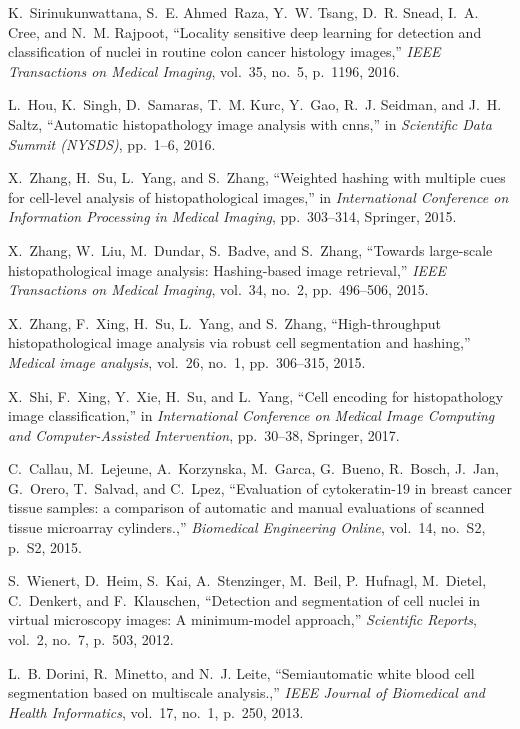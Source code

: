 \documentclass[journal]{IEEEtran}
\begin{document}
\begin{thebibliography}{10}
K.~Sirinukunwattana, S.~E. Ahmed~Raza, Y.~W. Tsang, D.~R. Snead, I.~A. Cree,
  and N.~M. Rajpoot, ``Locality sensitive deep learning for detection and
  classification of nuclei in routine colon cancer histology images,'' {\em
  IEEE Transactions on Medical Imaging}, vol.~35, no.~5, p.~1196, 2016.

L.~Hou, K.~Singh, D.~Samaras, T.~M. Kurc, Y.~Gao, R.~J. Seidman, and J.~H.
  Saltz, ``Automatic histopathology image analysis with cnns,'' in {\em
  Scientific Data Summit (NYSDS)}, pp.~1--6, 2016.

X.~Zhang, H.~Su, L.~Yang, and S.~Zhang, ``Weighted hashing with multiple cues
  for cell-level analysis of histopathological images,'' in {\em International
  Conference on Information Processing in Medical Imaging}, pp.~303--314,
  Springer, 2015.

X.~Zhang, W.~Liu, M.~Dundar, S.~Badve, and S.~Zhang, ``Towards large-scale histopathological image analysis: Hashing-based image retrieval,''{\em
    IEEE Transactions on Medical Imaging}, vol.~34, no.~2, pp.~496--506, 2015.

X.~Zhang, F.~Xing, H.~Su, L.~Yang, and S.~Zhang, ``High-throughput histopathological image analysis via robust cell segmentation and hashing,''{\em
    Medical image analysis}, vol.~26, no.~1, pp.~306--315, 2015.

X.~Shi, F.~Xing, Y.~Xie, H.~Su, and L.~Yang, ``Cell encoding for histopathology
  image classification,'' in {\em International Conference on Medical Image
  Computing and Computer-Assisted Intervention}, pp.~30--38, Springer, 2017.

C.~Callau, M.~Lejeune, A.~Korzynska, M.~Garca, G.~Bueno, R.~Bosch, J.~Jan,
  G.~Orero, T.~Salvad, and C.~Lpez, ``Evaluation of cytokeratin-19 in
  breast cancer tissue samples: a comparison of automatic and manual
  evaluations of scanned tissue microarray cylinders.,'' {\em Biomedical
  Engineering Online}, vol.~14, no.~S2, p.~S2, 2015.

S.~Wienert, D.~Heim, S.~Kai, A.~Stenzinger, M.~Beil, P.~Hufnagl, M.~Dietel,
  C.~Denkert, and F.~Klauschen, ``Detection and segmentation of cell nuclei in
  virtual microscopy images: A minimum-model approach,'' {\em Scientific
  Reports}, vol.~2, no.~7, p.~503, 2012.

L.~B. Dorini, R.~Minetto, and N.~J. Leite, ``Semiautomatic white blood cell
  segmentation based on multiscale analysis.,'' {\em IEEE Journal of Biomedical
  and Health Informatics}, vol.~17, no.~1, p.~250, 2013.


\end{thebibliography}
\end{document}
